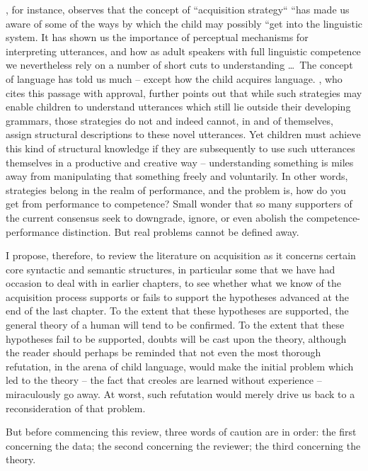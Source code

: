 \citet[353]{Cromer1976}, for instance, observes that the concept of
``acquisition strategy`` ``has made us aware of some of the ways by which the child may possibly ``get into the linguistic system. It has shown us the importance of perceptual mechanisms for interpreting utterances, and how as adult speakers with full linguistic competence we nevertheless rely on a number of short cuts to understanding \ldots~The concept of language  has told us much -- except how the child acquires language. \citet{Bowerman1979}, who cites this passage with approval, further points out that while such strategies may enable children to understand utterances which still lie outside their developing grammars, those strategies do not and indeed cannot, in and of themselves, assign structural descriptions to these novel utterances. Yet children must achieve this kind of structural knowledge if they are subsequently to use such utterances themselves in a productive and creative way -- understanding something is miles away from manipulating that something freely and voluntarily. In other words, strategies belong in the realm of performance, and the problem is, how do you get from performance to competence? Small wonder that so many supporters of the current consensus seek to downgrade, ignore, or even abolish the competence-performance distinction. But real problems cannot be defined away.

I propose, therefore, to review the literature on acquisition as it concerns certain core syntactic and semantic structures, in particular some that we have had occasion to deal with in earlier chapters, to see whether what we know of the acquisition process supports or fails to support the hypotheses advanced at the end of the last chapter. To the extent that these hypotheses are supported, the general theory of a human  will tend to be confirmed. To the extent that these hypotheses fail to be supported, doubts will be cast upon the theory, although the reader should perhaps be reminded that not even the most thorough refutation, in the arena of child language, would make the initial problem which led to the theory -- the fact that creoles are learned without experience -- miraculously go away. At worst, such refutation would merely drive us back to a reconsideration of that problem.

But before commencing this review, three words of caution are in order: the first concerning the data; the second concerning the reviewer; the third concerning the theory.

